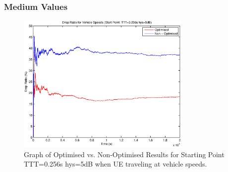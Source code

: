 \subsubsection*{Medium Values}
\begin{figure}[H]
  \begin{center}
    	  \includegraphics[width=0.75\textwidth]{figures/vehicle_figures/mid/long_drop.eps}
    \end{center}
    \caption{Graph of Optimised vs. Non-Optimised Results for Starting Point TTT=0.256s hys=5dB when UE traveling at vehicle speeds.}
    \label{fig:veh_mid_drop}
\end{figure}

